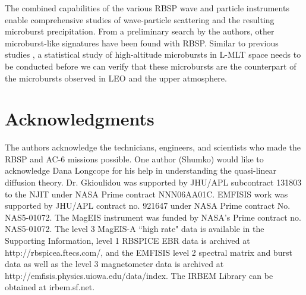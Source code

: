 The combined capabilities of the various RBSP wave and particle instruments enable comprehensive studies of wave-particle scattering and the resulting microburst precipitation. From a preliminary search by the authors, other microburst-like signatures have been found with RBSP. Similar to previous studies \citep[e.g.][]{O'Brien2003, Blum2015}, a statistical study of high-altitude microbursts in L-MLT space needs to be conducted before we can verify that these microbursts are the counterpart of the microbursts observed in LEO and the upper atmosphere.

\section{Acknowledgments}
The authors acknowledge the technicians, engineers, and scientists who made the RBSP and AC-6 missions possible. One author (Shumko) would like to acknowledge Dana Longcope for his help in understanding the quasi-linear diffusion theory. Dr. Gkioulidou was supported by JHU/APL subcontract 131803 to the NJIT under NASA Prime contract NNN06AA01C. EMFISIS work was supported by JHU/APL contract no. 921647 under NASA Prime contract No. NAS5-01072. The MagEIS instrument was funded by NASA's Prime contract no. NAS5-01072. The level 3 MagEIS-A ``high rate" data is available in the Supporting Information, level 1 RBSPICE EBR data is archived at http://rbspicea.ftecs.com/, and the EMFISIS level 2 spectral matrix and burst data as well as the level 3 magnetometer data is archived at http://emfisis.physics.uiowa.edu/data/index. The IRBEM Library can be obtained at irbem.sf.net.